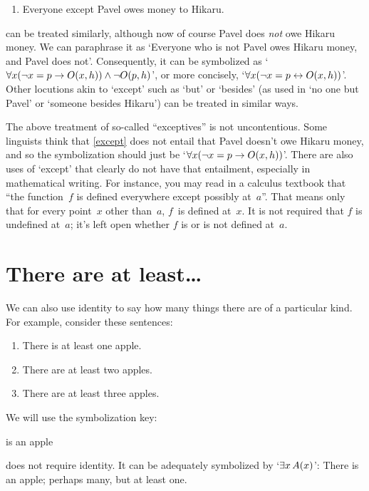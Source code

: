 \begin{enumerate}
	\item\label{except} Everyone except Pavel owes money to Hikaru.
	\end{enumerate}
 can be treated similarly, although now of course Pavel does \emph{not} owe Hikaru money. We can paraphrase it as `Everyone who is not Pavel owes Hikaru money, and Pavel does not'. Consequently, it can be symbolized as `$\forall x(\neg x = p \rightarrow O(x,h)) \wedge \neg O(p,h)$', or more concisely, `$\forall x(\neg x = p \leftrightarrow O(x,h))$'. Other locutions akin to `except' such as `but' or `besides' (as used in `no one but Pavel' or `someone besides Hikaru') can be treated in similar ways.

The above treatment of so-called ``exceptives'' is not uncontentious. Some linguists think that \cref*{except} does not entail that Pavel doesn't owe Hikaru money, and so the symbolization should just be `$\forall x(\neg x = p \rightarrow O(x,h))$'.  There are also uses of `except' that clearly do not have that entailment, especially in mathematical writing.  For instance, you may read in a calculus textbook that ``the function~$f$ is defined everywhere except possibly at~$a$''.  That means only that for every point~$x$ other than~$a$, $f$~is defined at~$x$. It is not required that $f$ is undefined at~$a$; it's left open whether $f$ is or is not defined at~$a$.

\section{There are at least\ldots}
We can also use identity to say how many things there are of a particular kind. For example, consider these sentences:
\begin{enumerate}
\item\label{atleast1} There is at least one apple.
\item\label{atleast2} There are at least two apples.
\item\label{atleast3} There are at least three apples.
\end{enumerate}
We will use the symbolization key:
	\begin{ekey}
		\item[\atom{A}{x}]  is an apple
	\end{ekey}
 does not require identity. It can be adequately symbolized by `$\exists x\, A(x)$': There is an apple; perhaps many, but at least one.

